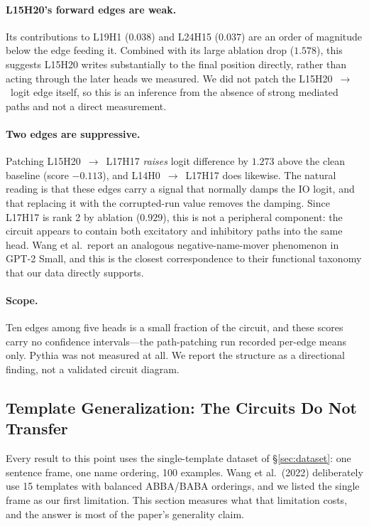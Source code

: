 \documentclass[11pt,a4paper]{article}
\begin{document}
\paragraph{L15H20's forward edges are weak.} Its contributions to L19H1 ($0.038$) and
L24H15 ($0.037$) are an order of magnitude below the edge feeding it. Combined with its
large ablation drop ($1.578$), this suggests L15H20 writes substantially to the final
position directly, rather than acting through the later heads we measured. We did not
patch the L15H20~$\to$~logit edge itself, so this is an inference from the absence of
strong mediated paths and not a direct measurement.

\paragraph{Two edges are suppressive.} Patching L15H20~$\to$~L17H17 \emph{raises} logit
difference by $1.273$ above the clean baseline (score $-0.113$), and
L14H0~$\to$~L17H17 does likewise. The natural reading is that these edges carry a
signal that normally damps the IO logit, and that replacing it with the corrupted-run
value removes the damping. Since L17H17 is rank 2 by ablation ($0.929$), this is not a
peripheral component: the circuit appears to contain both excitatory and inhibitory
paths into the same head. Wang et al.\ report an analogous negative-name-mover
phenomenon in GPT-2 Small, and this is the closest correspondence to their functional
taxonomy that our data directly supports.

\paragraph{Scope.} Ten edges among five heads is a small fraction of the circuit, and
these scores carry no confidence intervals---the path-patching run recorded per-edge
means only. Pythia was not measured at all. We report the structure as a directional
finding, not a validated circuit diagram.

\subsection{Template Generalization: The Circuits Do Not Transfer}
\label{sec:template}

Every result to this point uses the single-template dataset of \S\ref{sec:dataset}: one
sentence frame, one name ordering, 100 examples. Wang et al.\ (2022) deliberately use 15
templates with balanced ABBA/BABA orderings, and we listed the single frame as our first
limitation. This section measures what that limitation costs, and the answer is most of
the paper's generality claim.
\end{document}
